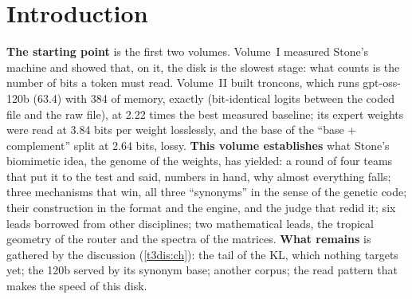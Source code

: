 
\chapter{Introduction}\label{t3int:ch}

\begin{origine}
\textbf{The starting point} is the first two volumes. Volume~I measured Stone's machine and showed that, on it, the disk is the slowest stage: what counts is the number of bits a token must read. Volume~II built troncons, which runs gpt-oss-120b (\SI{63.4}{\Go}) with \SI{384}{\Mo} of memory, exactly (bit-identical logits between the coded file and the raw file), at \num{2.22} times the best measured baseline; its expert weights were read at \num{3.84} bits per weight losslessly, and the base of the ``base + complement'' split at \num{2.64} bits, lossy.
\textbf{This volume establishes} what Stone's biomimetic idea, the genome of the weights, has yielded: a round of four teams that put it to the test and said, numbers in hand, why almost everything falls; three mechanisms that win, all three ``synonyms'' in the sense of the genetic code; their construction in the format and the engine, and the judge that redid it; six leads borrowed from other disciplines; two mathematical leads, the tropical geometry of the router and the spectra of the matrices.
\textbf{What remains} is gathered by the discussion (\cref{t3dis:ch}): the tail of the KL, which nothing targets yet; the 120b served by its synonym base; another corpus; the read pattern that makes the speed of this disk.
\end{origine}

